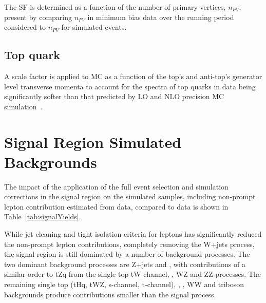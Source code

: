 The \PU SF is determined as a function of the number of primary vertices, $n_{PV}$, present by comparing $n_{PV}$ in minimum bias data over the running period considered to $n_{PV}$ for simulated events.

\subsection{Top quark \pt}
A scale factor is applied to \ttbar MC as a function of the top's and anti-top's generator level transverse momenta to account for the \pt spectra of top quarks in data being significantly softer than that predicted by LO and NLO precision MC simulation~\cite{Khachatryan:2015oqa}.


\section{Signal Region Simulated Backgrounds}\label{sec:simBackgrounds}
The impact of the application of the full event selection and simulation corrections in the signal region on the simulated samples, including non-prompt lepton contribution estimated from data, compared to data is shown in Table~\ref{tab:signalYields}.

While jet cleaning and tight isolation criteria for leptons has significantly reduced the non-prompt lepton contributions, completely removing the W+jets process, the signal region is still dominated by a number of background processes.
The two dominant background processes are Z+jets and \ttbar, with contributions of a similar order to tZq from the single top tW-channel, \ttbarZ, WZ and ZZ processes.
The remaining single top (tHq, tWZ, s-channel, t-channel), \ttbarW, \ttbarH, WW and triboson backgrounds produce contributions smaller than the signal process.

